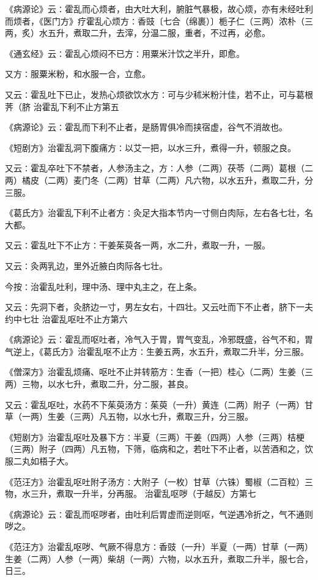 \documentclass[a4paper,12pt,UTF8,twoside]{ctexbook}
\begin{document}
《病源论》云∶霍乱而心烦者，由大吐大利，腑脏气暴极，故心烦，亦有未经吐利而烦者，《医门方》疗霍乱心烦方∶香豉〔七合（绵裹）〕栀子仁（三两）浓朴（三两，炙）水五升，煮取二升，去滓，分温二服，重者，不过再，必愈。

《通玄经》云∶霍乱心烦闷不已方∶用粟米汁饮之半升，即愈。

又方∶服粟米粉，和水服一合，立愈。

又云∶霍乱吐下已止，发热心烦欲饮水方∶可与少秫米粉汁佳，若不止，可与葛根荠（脐
治霍乱下利不止方第五

《病源论》云∶霍乱而下利不止者，是肠胃俱冷而挟宿虚，谷气不消故也。

《短剧方》治霍乱洞下腹痛方∶以艾一把，以水三升，煮得一升，顿服之良。

又云∶霍乱卒吐下不禁者，人参汤主之，方∶人参（二两）茯苓（二两）葛根（二两）橘皮（二两）麦门冬（二两）甘草（二两）凡六物，以水五升，煮取二升，分三服。

《葛氏方》治霍乱下利不止者方∶灸足大指本节内一寸侧白肉际，左右各七壮，名大都。

又云∶霍乱吐下不止方∶干姜茱萸各一两，水二升，煮取一升，一服。

又云∶灸两乳边，里外近腋白肉际各七壮。

今按∶治霍乱吐利，理中汤、理中丸主之，在上条。

又云∶先洞下者，灸脐边一寸，男左女右，十四壮。又云吐而下不止者，脐下一夫约中七壮
治霍乱呕吐不止方第六

《病源论》云∶霍乱而呕吐者，冷气入于胃，胃气变乱，冷邪既盛，谷气不和，胃气逆上，《葛氏方》治霍乱呕不止方∶生姜五两，水五升，煮取二升半，分三服。

《僧深方》治霍乱烦痛、呕吐不止并转筋方∶生香（一把）桂心（二两）生姜（三两）三物，以水七升，煮取二升，分二服，甚良。

又云∶霍乱呕吐，水药不下茱萸汤方∶茱萸（一升）黄连（二两）附子（一两）甘草（一两）生姜（三两）凡五物，以水七升，煮取三升，分三服。

《短剧方》治霍乱呕吐及暴下方∶半夏（三两）干姜（四两）人参（三两）桔梗（三两）附子（四两）凡五物，下筛，临病和之，若吐下不止者，以苦酒和之，饮服二丸如梧子大。

《范汪方》治霍乱呕吐附子汤方∶大附子（一枚）甘草（六铢）蜀椒（二百粒）三物，水三升，煮取一升半，分再服。
治霍乱呕哕（于越反）方第七

《病源论》云∶霍乱而呕哕者，由吐利后胃虚而逆则呕，气逆遇冷折之，气不通则哕之。

《范汪方》治霍乱呕哕、气厥不得息方∶香豉（一升）半夏（一两）甘草（一两）生姜（二两）人参（一两）柴胡（一两）六物，以水五升，煮取二升半，服七合，日三。
\end{document}
